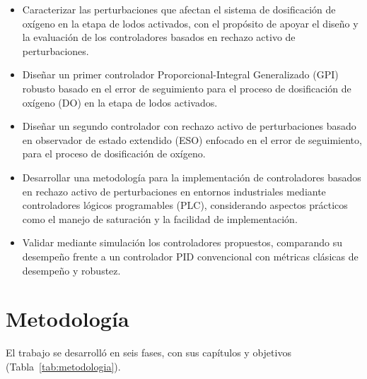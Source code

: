 \begin{itemize}
  \item[\textbf{OE1}] Caracterizar las perturbaciones que afectan el sistema de dosificación de
  oxígeno en la etapa de lodos activados, con el propósito de apoyar el diseño y la evaluación de los
  controladores basados en rechazo activo de perturbaciones.
  \item[\textbf{OE2}] Diseñar un primer controlador Proporcional-Integral Generalizado (GPI) robusto
  basado en el error de seguimiento para el proceso de dosificación de oxígeno (DO) en la etapa de
  lodos activados.
  \item[\textbf{OE3}] Diseñar un segundo controlador con rechazo activo de perturbaciones basado en
  observador de estado extendido (ESO) enfocado en el error de seguimiento, para el proceso de
  dosificación de oxígeno.
  \item[\textbf{OE4}] Desarrollar una metodología para la implementación de controladores basados
  en rechazo activo de perturbaciones en entornos industriales mediante controladores lógicos
  programables (PLC), considerando aspectos prácticos como el manejo de saturación y la facilidad de
  implementación.
  \item[\textbf{OE5}] Validar mediante simulación los controladores propuestos, comparando su
  desempeño frente a un controlador PID convencional con métricas clásicas de desempeño y
  robustez.
\end{itemize}


\section{Metodología}
\label{sec:metodologia}

El trabajo se desarrolló en seis fases, con sus capítulos y objetivos (Tabla~\ref{tab:metodologia}).


